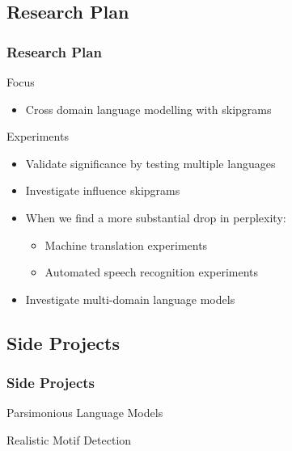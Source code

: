 \documentclass{beamer}
\begin{document}
\begin{frame}\section{Research Plan}
    \frametitle{Research Plan}

    \begin{block}{Focus}
        \begin{itemize}
            \item Cross domain language modelling with skipgrams
        \end{itemize}
    \end{block}

    \begin{block}{Experiments}
        \begin{itemize}
            \item Validate significance by testing multiple languages
            \item Investigate influence skipgrams
            \item When we find a more substantial drop in perplexity:
                \begin{itemize}
                    \item Machine translation experiments
                    \item Automated speech recognition experiments
                \end{itemize}
            \item Investigate multi-domain language models
        \end{itemize}
    \end{block}
\end{frame}

\begin{frame}\section{Side Projects}
    \frametitle{Side Projects}

    \begin{block}{Parsimonious Language Models}

    \end{block}

    \begin{block}{Realistic Motif Detection}

    \end{block}
\end{frame}
\end{document}
